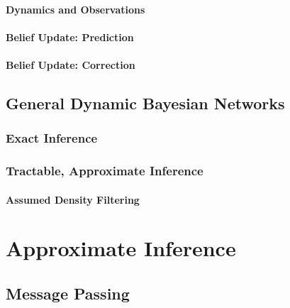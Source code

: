            \subsubsection{Dynamics and Observations} %

            \subsubsection{Belief Update: Prediction} %

            \subsubsection{Belief Update: Correction} %

    \section{General Dynamic Bayesian Networks} %

        \subsection{Exact Inference} %

        \subsection{Tractable, Approximate Inference} %

            \subsubsection{Assumed Density Filtering} %

\chapter{Approximate Inference} %

    \section{Message Passing} %


